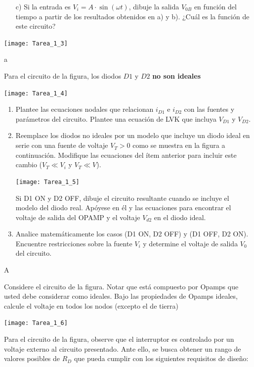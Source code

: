 \documentclass[
  11pt,
  letterpaper,
   addpoints,
  ]{exam}
\begin{document}
\begin{questions}
\begin{enumerate}
    \item[c)] Si la entrada es $V_i = A \cdot \sin(\omega t)$, dibuje la salida $V_{0B}$ en función del tiempo a partir de los resultados obtenidos en a) y b). ¿Cuál es la función de este circuito?
\end{enumerate}
\begin{center}
    \texttt{[image: Tarea\_1\_3]}
\end{center}
\begin{solution}
    a
\end{solution}
\question Para el circuito de la figura, los diodos $D1$ y $D2$ \textbf{no son ideales}
\begin{center}
    \texttt{[image: Tarea\_1\_4]}
\end{center}
\begin{enumerate}
    \item Plantee las ecuaciones nodales que relacionan $i_{D1}$ e $i_{D2}$ con las fuentes y parámetros del circuito. Plantee una ecuación de LVK que incluya $V_{D1}$ y $V_{D2}$.
    \item Reemplace los diodos no ideales por un modelo que incluye un diodo ideal en serie con una fuente de voltaje $V_T>0$ como se muestra en la figura a continuación. Modifique las ecuaciones del ítem anterior para incluir este cambio ($V_T\ll V_i$ y $V_T\ll V$).
    \begin{center}
        \texttt{[image: Tarea\_1\_5]}
    \end{center}
    Si D1 ON y D2 OFF, dibuje el circuito resultante cuando se incluye el modelo del diodo
    real. Apóyese en él y las ecuaciones para encontrar el voltaje de salida del OPAMP y el voltaje $V_{d2}$ en el diodo ideal.
    
    \item Analice matemáticamente los casos (D1 ON, D2 OFF) y (D1 OFF, D2 ON). Encuentre restricciones sobre la fuente $V_i$ y determine el voltaje de salida $V_0$ del circuito.
\end{enumerate}
\begin{solution}
   A
\end{solution}
\question Considere el circuito de la figura. Notar que está compuesto por Opamps que usted debe considerar como ideales. Bajo las propiedades de Opamps ideales, calcule el voltaje en todos los nodos (excepto el de tierra)
\begin{center}
    \texttt{[image: Tarea\_1\_6]}
\end{center}
\question Para el circuito de la figura, observe que el interruptor es controlado por un voltaje externo al circuito presentado. Ante ello, se busca obtener un rango de valores posibles de $R_D$ que pueda cumplir con los siguientes requisitos de diseño:


\end{questions}
\end{document}
